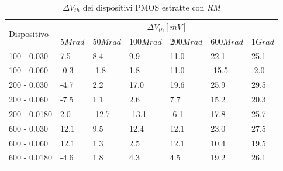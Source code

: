 \documentclass[12pt, letterpaper]{book}
\begin{document}
\begin{table}[H]
  \renewcommand{\arraystretch}{1.3}
  \begin{tabular}{m{2.1cm}  m{1.1cm} m{1.3cm} m{1.5cm} m{1.5cm} m{1.5cm} m{1cm}}
    \toprule
    \multirow{2}{*}{Dispositivo} & \multicolumn{6}{c}{$\Delta V_{th} [mV] $}                                                          \\
    \cmidrule{2-7}
                                 & $5Mrad$                                   & $50Mrad$ & $100Mrad$ & $200Mrad$ & $600Mrad$ & $1Grad$ \\
    \midrule
    100 - 0.030                     & 7.5                                       & 8.4      & 9.9       & 11.0      & 22.1      & 25.1    \\
    \hline
    100 - 0.060                     & -0.3                                      & -1.8     & 1.8       & 11.0      & -15.5     & -2.0    \\
    \hline
    200 - 0.030                     & -4.7                                      & 2.2      & 17.0      & 19.6      & 25.9      & 29.5    \\
    \hline
    200 - 0.060                     & -7.5                                      & 1.1      & 2.6       & 7.7       & 15.2      & 20.3    \\
    \hline
    200 - 0.0180                    & 2.0                                       & -12.7    & -13.1     & -6.1      & 17.8      & 25.7    \\
    \hline
    600 - 0.030                     & 12.1                                      & 9.5      & 12.4      & 12.1      & 23.0      & 27.5    \\
    \hline
    600 - 0.060                     & 12.1                                      & 1.3      & 2.5       & 12.1      & 10.4      & 19.5    \\
    \hline
    600 - 0.0180                    & -4.6                                      & 1.8      & 4.3       & 4.5       & 19.2      & 26.1    \\
    \bottomrule
  \end{tabular}
  \caption{$\Delta V_{th}$ dei dispositivi PMOS estratte con \emph{RM}}
  \label{tab:deltaVthRMP}
\end{table}
\end{document}
